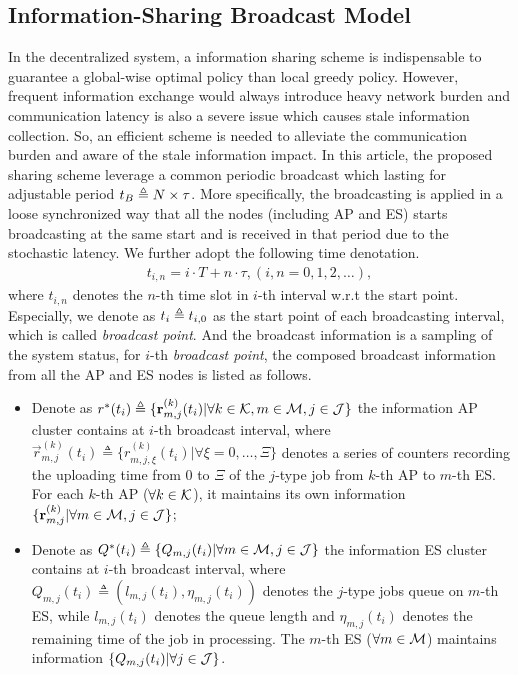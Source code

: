 \subsection{Information-Sharing Broadcast Model}
In the decentralized system, a information sharing scheme is indispensable to guarantee a global-wise optimal policy than local greedy policy.
However, frequent information exchange would always introduce heavy network burden and communication latency is also a severe issue which causes stale information collection. So, an efficient scheme is needed to alleviate the communication burden and aware of the stale information impact.
In this article, the proposed sharing scheme leverage a common periodic broadcast which lasting for adjustable period $t_B \triangleq N \times \tau$. More specifically, the broadcasting is applied in a loose synchronized way that all the nodes (including AP and ES) starts broadcasting at the same start and is received in that period due to the stochastic latency. We further adopt the following time denotation.
\begin{align}
    t_{i,n} = i \cdot T + n \cdot \tau, (i,n=0,1,2,\dots),
\end{align}
where $t_{i,n}$ denotes the $n$-th time slot in $i$-th interval w.r.t the start point. Especially, we denote as $t_{i} \triangleq t_{i,0}$ as the start point of each broadcasting interval, which is called \emph{broadcast point}.
And the broadcast information is a sampling of the system status, for $i$-th \emph{broadcast point}, the composed broadcast information from all the AP and ES nodes is listed as follows.
\begin{itemize}
    \item Denote as
    $r^*(t_{i}) \triangleq \{ \mathbf{r}^{(k)}_{m,j}(t_i)|\forall k\in\mathcal{K}, m\in\mathcal{M}, j\in\mathcal{J} \}$
    the information AP cluster contains at $i$-th broadcast interval, where
    $\vec{r}^{(k)}_{m,j}(t_i) \triangleq \{ r^{(k)}_{m,j,\xi}(t_i)|\forall \xi=0,\dots,\Xi \}$
    denotes a series of counters recording the uploading time from $0$ to $\Xi$ of the $j$-type job from $k$-th AP to $m$-th ES.
    For each $k$-th AP ($\forall k\in\mathcal{K}$), it maintains its own information $\{ \mathbf{r}^{(k)}_{m,j} | \forall m\in\mathcal{M}, j\in\mathcal{J}\}$;
    \item Denote as
    $Q^*(t_{i}) \triangleq \{ Q_{m,j}(t_i)|\forall m\in\mathcal{M},j\in\mathcal{J} \}$
    the information ES cluster contains at $i$-th broadcast interval, where
    $Q_{m,j}(t_i) \triangleq (l_{m,j}(t_i), \eta_{m,j}(t_i))$
    denotes the $j$-type jobs queue on $m$-th ES, while $l_{m,j}(t_i)$ denotes the queue length and $\eta_{m,j}(t_i)$ denotes the remaining time of the job in processing.
    The $m$-th ES ($\forall m\in\mathcal{M}$) maintains information $\{ Q_{m,j}(t_i)|\forall j\in\mathcal{J} \}$.
\end{itemize}
